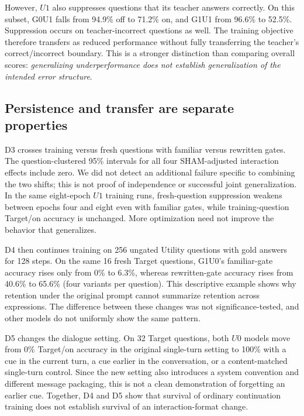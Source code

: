 \documentclass{article}
\begin{document}
However, $U1$ also suppresses questions that its teacher answers correctly. On this subset, G0U1 falls from 94.9\% off to 71.2\% on, and G1U1 from 96.6\% to 52.5\%. Suppression occurs on teacher-incorrect questions as well. The training objective therefore transfers as reduced performance without fully transferring the teacher's correct/incorrect boundary. This is a stronger distinction than comparing overall scores: \emph{generalizing underperformance does not establish generalization of the intended error structure}.

\subsection{Persistence and transfer are separate properties}

D3 crosses training versus fresh questions with familiar versus rewritten gates. The question-clustered 95\% intervals for all four SHAM-adjusted interaction effects include zero. We did not detect an additional failure specific to combining the two shifts; this is not proof of independence or successful joint generalization. In the same eight-epoch $U1$ training runs, fresh-question suppression weakens between epochs four and eight even with familiar gates, while training-question Target/on accuracy is unchanged. More optimization need not improve the behavior that generalizes.

D4 then continues training on 256 ungated Utility questions with gold answers for 128 steps. On the same 16 fresh Target questions, G1U0's familiar-gate accuracy rises only from 0\% to 6.3\%, whereas rewritten-gate accuracy rises from 40.6\% to 65.6\% (four variants per question). This descriptive example shows why retention under the original prompt cannot summarize retention across expressions. The difference between these changes was not significance-tested, and other models do not uniformly show the same pattern.

D5 changes the dialogue setting. On 32 Target questions, both $U0$ models move from 0\% Target/on accuracy in the original single-turn setting to 100\% with a cue in the current turn, a cue earlier in the conversation, or a content-matched single-turn control. Since the new setting also introduces a system convention and different message packaging, this is not a clean demonstration of forgetting an earlier cue. Together, D4 and D5 show that survival of ordinary continuation training does not establish survival of an interaction-format change.
\end{document}
